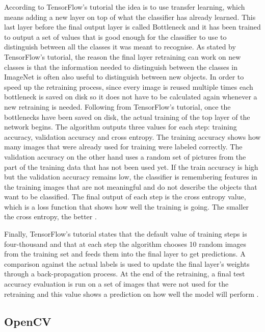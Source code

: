 \documentclass{l4proj}
\begin{document}
According to TensorFlow's tutorial \cite{Retraining} the idea is to use transfer learning, which means adding a new layer on top of what the classifier has already learned. This last layer before the final output layer is called Bottleneck and it has been trained to output a set of values that is good enough for the classifier to use to distinguish between all the classes it was meant to recognise. As stated by TensorFlow's tutorial, the reason the final layer retraining can work on new classes is that the information needed to distinguish between the classes in ImageNet is often also useful to distinguish between new objects. In order to speed up the retraining process, since every image is reused multiple times each bottleneck is saved on disk so it does not have to be calculated again whenever a new retraining is needed. Following from TensorFlow's tutorial, once the bottlenecks have been saved on disk, the actual training of the top layer of the network begins. The algorithm outputs three values for each step: training accuracy, validation accuracy and cross entropy. The training accuracy shows how many images that were already used for training were labeled correctly. The validation accuracy on the other hand uses a random set of pictures from the part of the training data that has not been used yet. If the train accuracy is high but the validation accuracy remains low, the classifier is remembering features in the training images that are not meaningful and do not describe the objects that want to be classified. The final output of each step is the cross entropy value, which is a loss function that shows how well the training is going. The smaller the cross entropy, the better \cite{Retraining}.

Finally, TensorFlow's tutorial states that the default value of training steps is four-thousand and that at each step the algorithm chooses 10 random images from the training set and feeds them into the final layer to get predictions. A comparison against the actual labels is used to update the final layer's weights through a back-propagation process. At the end of the retraining, a final test accuracy evaluation is run on a set of images that were not used for the retraining and this value shows a prediction on how well the model will perform \cite{Retraining}.

\subsection{OpenCV}
\end{document}
